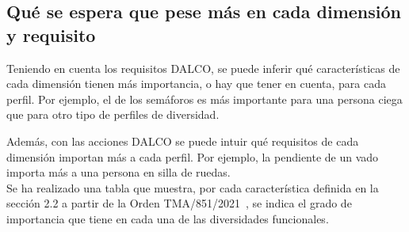 \subsection{Qué se espera que pese más en cada dimensión y requisito}

Teniendo en cuenta los requisitos DALCO, se puede inferir qué características de cada dimensión tienen más importancia, o hay que tener en cuenta, para cada perfil. Por ejemplo, el  de los semáforos es más importante para una persona ciega que para otro tipo de perfiles de diversidad.
\\


\newcommand{\pesoalto}{\tikz[baseline=-0.6ex]\fill[black] (0,0) circle (0.9mm);}
\newcommand{\pesomedio}{\tikz[baseline=-0.6ex]{\draw[line width=0.4pt] (0,0) circle (0.9mm);\fill (0,0.9mm) arc (90:-90:0.9mm) -- cycle;}}
\newcommand{\pesonulo}{\tikz[baseline=-0.6ex]\draw[line width=0.4pt] (0,0) circle (0.9mm);}

Además, con las acciones DALCO se puede intuir qué requisitos de cada dimensión importan más a cada perfil. Por ejemplo, la pendiente de un vado importa más a una persona en silla de ruedas.
\\

Se ha realizado una tabla que muestra, por cada característica definida en la sección 2.2 a partir de la Orden TMA/851/2021~\parencite{mitma_orden_tma851_2021}, se indica el grado de importancia que tiene en cada una de las diversidades funcionales.
\\

